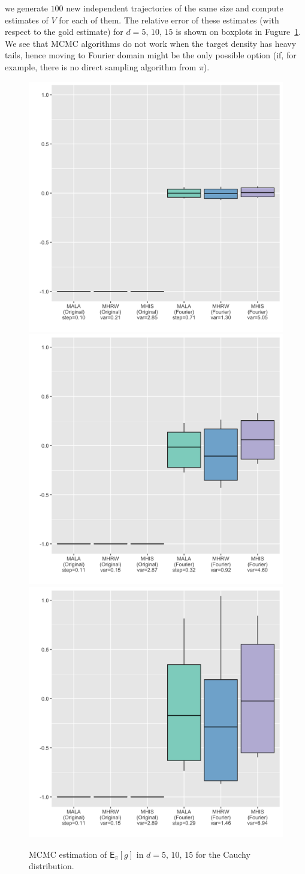 \documentclass[preprint, 3p, authoryear]{elsarticle}
\newcommand{\E}{\mathsf{E}}
\theoremstyle{definition}
\begin{document}
we generate $100$ new independent trajectories of the same size and compute estimates of $V$ for 
each of them. The relative error of these estimates (with respect to the gold estimate) for $d=5,\,10,\,15$ is shown on boxplots in Fugure~\ref{fig:mcmc1}. 
We see that MCMC algorithms do not work when the target density 
has heavy tails, hence moving to Fourier domain might be the only possible option (if, for example, there is no direct sampling algorithm from $\pi$).
\begin{figure}[htb]
\includegraphics[width=0.33\linewidth]{d5_MCMC_relative.png}
\includegraphics[width=0.33\linewidth]{d10_MCMC_relative.png}
\includegraphics[width=0.33\linewidth]{d15_MCMC_relative.png}
\caption{\label{fig:mcmc1} MCMC estimation of $\E_\pi[g]$ in $d=5,\,10,\,15$ for the Cauchy distribution.}
\end{figure}
\end{document}
